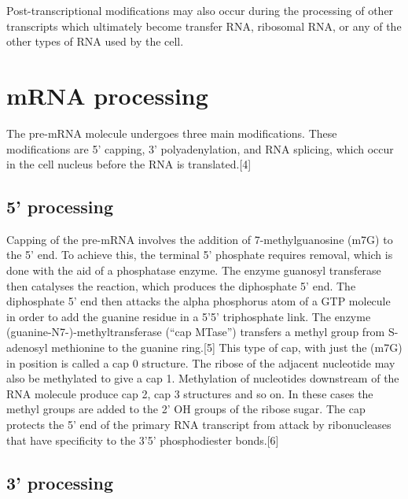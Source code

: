 Post-transcriptional modifications may also occur during the processing of other transcripts which ultimately become transfer RNA, ribosomal RNA, or any of the other types of RNA used by the cell.

\hypertarget{mrna-processing}{%
\section{mRNA processing}\label{mrna-processing}}

The pre-mRNA molecule undergoes three main modifications. These modifications are 5' capping, 3' polyadenylation, and RNA splicing, which occur in the cell nucleus before the RNA is translated.{[}4{]}

\hypertarget{processing}{%
\subsection{5' processing}\label{processing}}

Capping of the pre-mRNA involves the addition of 7-methylguanosine (m7G) to the 5' end. To achieve this, the terminal 5' phosphate requires removal, which is done with the aid of a phosphatase enzyme. The enzyme guanosyl transferase then catalyses the reaction, which produces the diphosphate 5' end. The diphosphate 5' end then attacks the alpha phosphorus atom of a GTP molecule in order to add the guanine residue in a 5'5' triphosphate link. The enzyme (guanine-N7-)-methyltransferase (``cap MTase'') transfers a methyl group from S-adenosyl methionine to the guanine ring.{[}5{]} This type of cap, with just the (m7G) in position is called a cap 0 structure. The ribose of the adjacent nucleotide may also be methylated to give a cap 1. Methylation of nucleotides downstream of the RNA molecule produce cap 2, cap 3 structures and so on. In these cases the methyl groups are added to the 2' OH groups of the ribose sugar. The cap protects the 5' end of the primary RNA transcript from attack by ribonucleases that have specificity to the 3'5' phosphodiester bonds.{[}6{]}

\hypertarget{processing-1}{%
\subsection{3' processing}\label{processing-1}}

